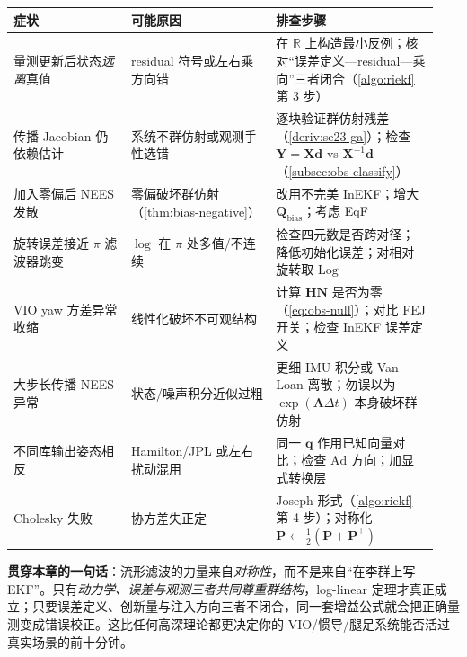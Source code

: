 \begin{table}[H]\centering\small
\begin{tabular}{p{0.26\linewidth}p{0.32\linewidth}p{0.36\linewidth}}
\toprule
症状 & 可能原因 & 排查步骤 \\
\midrule
量测更新后状态\emph{远离}真值 & residual 符号或左右乘方向错 & 在 $\mathbb{R}$ 上构造最小反例；核对“误差定义—residual—乘向”三者闭合（\cref{algo:riekf} 第 3 步） \\
传播 Jacobian 仍依赖估计 & 系统不群仿射或观测手性选错 & 逐块验证群仿射残差（\cref{deriv:se23-ga}）；检查 $\mathbf{Y}=\mathbf{X}\mathbf{d}$ vs $\mathbf{X}^{-1}\mathbf{d}$（\cref{subsec:obs-classify}） \\
加入零偏后 NEES 发散 & 零偏破坏群仿射（\cref{thm:bias-negative}） & 改用不完美 InEKF；增大 $\mathbf{Q}_{\text{bias}}$；考虑 EqF \\
旋转误差接近 $\pi$ 滤波器跳变 & $\log$ 在 $\pi$ 处多值/不连续 & 检查四元数是否跨对径；降低初始化误差；对相对旋转取 $\mathrm{Log}$ \\
VIO yaw 方差异常收缩 & 线性化破坏不可观结构 & 计算 $\mathbf{H}\mathbf{N}$ 是否为零（\cref{eq:obs-null}）；对比 FEJ 开关；检查 InEKF 误差定义 \\
大步长传播 NEES 异常 & 状态/噪声积分近似过粗 & 更细 IMU 积分或 Van Loan 离散；勿误以为 $\exp(\mathbf{A}\Delta t)$ 本身破坏群仿射 \\
不同库输出姿态相反 & Hamilton/JPL 或左右扰动混用 & 同一 $\mathbf{q}$ 作用已知向量对比；检查 $\mathrm{Ad}$ 方向；加显式转换层 \\
Cholesky 失败 & 协方差失正定 & Joseph 形式（\cref{algo:riekf} 第 4 步）；对称化 $\mathbf{P}\leftarrow\tfrac12(\mathbf{P}+\mathbf{P}^\top)$ \\
\bottomrule
\end{tabular}
\end{table}

\begin{insight}
\textbf{贯穿本章的一句话}：流形滤波的力量来自\emph{对称性}，而不是来自“在李群上写 EKF”。只有\emph{动力学、误差与观测三者共同尊重群结构}，log-linear 定理才真正成立；只要误差定义、创新量与注入方向三者不闭合，同一套增益公式就会把正确量测变成错误校正。这比任何高深理论都更决定你的 VIO/惯导/腿足系统能否活过真实场景的前十分钟。
\end{insight}
